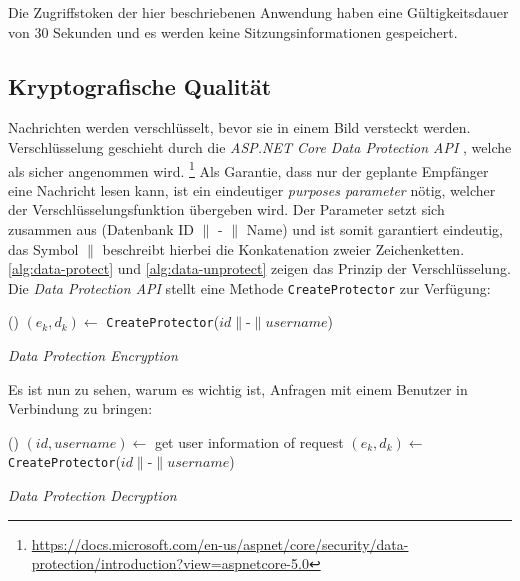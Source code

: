 \noindent
Die Zugriffstoken der hier beschriebenen Anwendung haben eine Gültigkeitsdauer
von 30 Sekunden und es werden keine Sitzungsinformationen gespeichert.

\subsection{Kryptografische Qualität}
Nachrichten werden verschlüsselt, bevor sie in einem Bild versteckt werden.
Verschlüssel\-ung geschieht durch die \textit{ASP.NET Core Data Protection API}
, welche als sicher angenommen wird.
\footnote{\url{https://docs.microsoft.com/en-us/aspnet/core/security/data-protection/introduction?view=aspnetcore-5.0}}
Als Garantie, dass nur der geplante Empfänger eine Nachricht lesen
kann, ist ein eindeutiger \textit{purposes parameter} nötig, welcher
der Verschlüsselungsfunktion übergeben wird.
Der Parameter setzt sich zusammen aus (Datenbank ID $\parallel$ - $\parallel$ Name)
und ist somit garantiert eindeutig, das Symbol $\parallel$
beschreibt hierbei die Konkatenation zweier Zeichenketten.
\autoref{alg:data-protect} und \ref{alg:data-unprotect}
zeigen das Prinzip der Verschlüsselung. Die \textit{Data Protection API} stellt
eine Methode \texttt{CreateProtector} zur Verfügung:

\begin{singlespace}
  \begin{algorithm}[h]
    \DontPrintSemicolon
    \Begin(){
      $(e_k, d_k) \leftarrow$ \texttt{CreateProtector}($id \parallel \text{-} \parallel username$)\;
    }
    \caption{\textit{Data Protection Encryption}}
    \label{alg:data-protect}
  \end{algorithm}
\end{singlespace}

\noindent
Es ist nun zu sehen, warum es wichtig ist, Anfragen mit einem Benutzer in Verbindung zu bringen:

\begin{singlespace}
  \begin{algorithm}[h]
    \DontPrintSemicolon
    \Begin(){
      $(id, username) \leftarrow$ get user information of request\;
      $(e_k, d_k) \leftarrow$ \texttt{CreateProtector}($id \parallel \text{-} \parallel username$)\;
    }
    \caption{\textit{Data Protection Decryption}}
    \label{alg:data-unprotect}
  \end{algorithm}
\end{singlespace}

